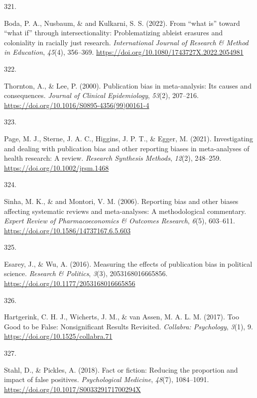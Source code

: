 \documentclass[
  11pt,
  letterpaper,
]{scrreprt}
\newlength{\cslhangindent}
\newlength{\csllabelwidth}
\newenvironment{CSLReferences}[2] %
 {\begin{list}{}{%
  \setlength{\itemindent}{0pt}
  \setlength{\leftmargin}{0pt}
  \setlength{\parsep}{0pt}
  \ifodd #1
   \setlength{\leftmargin}{\cslhangindent}
   \setlength{\itemindent}{-1\cslhangindent}
  \fi
  \setlength{\itemsep}{#2\baselineskip}}}
 {\end{list}}
\newcommand{\CSLLeftMargin}[1]{\parbox[t]{\csllabelwidth}{\strut#1\strut}}
\newcommand{\CSLRightInline}[1]{\parbox[t]{\linewidth - \csllabelwidth}{\strut#1\strut}}
\begin{document}
\begin{CSLReferences}{0}{0}
\CSLLeftMargin{321. }%
\CSLRightInline{Boda, P. A., Nusbaum, \& and Kulkarni, S. S. (2022).
From {``what is''} toward {``what if''} through intersectionality:
Problematizing ableist erasures and coloniality in racially just
research. \emph{International Journal of Research \& Method in
Education}, \emph{45}(4), 356--369.
\url{https://doi.org/10.1080/1743727X.2022.2054981}}

\CSLLeftMargin{322. }%
\CSLRightInline{Thornton, A., \& Lee, P. (2000). Publication bias in
meta-analysis: Its causes and consequences. \emph{Journal of Clinical
Epidemiology}, \emph{53}(2), 207--216.
\url{https://doi.org/10.1016/S0895-4356(99)00161-4}}

\CSLLeftMargin{323. }%
\CSLRightInline{Page, M. J., Sterne, J. A. C., Higgins, J. P. T., \&
Egger, M. (2021). Investigating and dealing with publication bias and
other reporting biases in meta-analyses of health research: {A} review.
\emph{Research Synthesis Methods}, \emph{12}(2), 248--259.
\url{https://doi.org/10.1002/jrsm.1468}}

\CSLLeftMargin{324. }%
\CSLRightInline{Sinha, M. K., \& and Montori, V. M. (2006). Reporting
bias and other biases affecting systematic reviews and meta-analyses: A
methodological commentary. \emph{Expert Review of Pharmacoeconomics \&
Outcomes Research}, \emph{6}(5), 603--611.
\url{https://doi.org/10.1586/14737167.6.5.603}}

\CSLLeftMargin{325. }%
\CSLRightInline{Esarey, J., \& Wu, A. (2016). Measuring the effects of
publication bias in political science. \emph{Research \& Politics},
\emph{3}(3), 2053168016665856.
\url{https://doi.org/10.1177/2053168016665856}}

\CSLLeftMargin{326. }%
\CSLRightInline{Hartgerink, C. H. J., Wicherts, J. M., \& van Assen, M.
A. L. M. (2017). Too {Good} to be {False}: {Nonsignificant Results
Revisited}. \emph{Collabra: Psychology}, \emph{3}(1), 9.
\url{https://doi.org/10.1525/collabra.71}}

\CSLLeftMargin{327. }%
\CSLRightInline{Stahl, D., \& Pickles, A. (2018). Fact or fiction:
Reducing the proportion and impact of false positives.
\emph{Psychological Medicine}, \emph{48}(7), 1084--1091.
\url{https://doi.org/10.1017/S003329171700294X}}


\end{CSLReferences}
\end{document}
